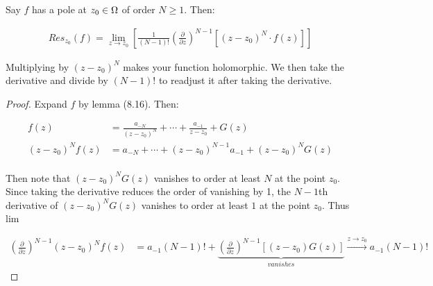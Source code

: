 \begin{lemma}
Say $f$ has a pole at $z_0 \in \Omega$ of order $N \geq 1$. Then:

\begin{align*}
    Res_{z_0}(f) = \lim_{z \to z_0} \left[ \frac{1}{(N-1)!} \left( \frac{\partial}{\partial z} \right)^{N-1} \left[ (z-z_0)^N \cdot f(z) \right] \right]
\end{align*}
\end{lemma}

\begin{note}
Multiplying by $(z-z_0)^N$ makes your function holomorphic. We then take the derivative and divide by $(N-1)!$ to readjust it after taking the derivative.
\end{note}

\begin{proof}
Expand $f$ by lemma (8.16). Then:

\begin{align*}
    f(z) &= \frac{a_{-N}}{(z-z_0)^N} + \cdots + \frac{a_{-1}}{z-z_0} + G(z)\\
    (z-z_0)^N f(z) &= a_{-N} + \cdots + (z-z_0)^{N-1} a_{-1} + (z-z_0)^N G(z)\\
\end{align*}

Then note that $(z-z_0)^N G(z)$ vanishes to order at least $N$ at the point $z_0$. Since taking the derivative reduces the order of vanishing by 1, the $N-1$th derivative of $(z-z_0)^N G(z)$ vanishes to order at least $1$ at the point $z_0$. Thus lim

\begin{align*}
    \left( \frac{\partial}{\partial z} \right)^{N-1} (z-z_0)^N f(z) &=  a_{-1} (N-1)! + \underbrace{ \left( \frac{\partial}{\partial z} \right)^{N-1} \left[ (z-z_0) G(z) \right]}_{vanishes} \xrightarrow[]{z \to z_0}  a_{-1}  (N-1)!
\end{align*}
\end{proof}

